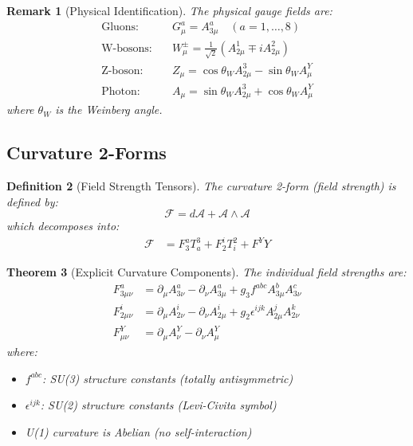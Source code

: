 \documentclass[12pt]{article}
\newtheorem{definition}{Definition}[section]
\newtheorem{theorem}[definition]{Theorem}
\newtheorem{remark}[definition]{Remark}
\begin{document}
\begin{remark}[Physical Identification]
The physical gauge fields are:
\begin{align}
\text{Gluons:} \quad &G^a_\mu = A^a_{3\mu} \quad (a=1,\ldots,8) \\
\text{W-bosons:} \quad &W^\pm_\mu = \frac{1}{\sqrt{2}}(A^1_{2\mu} \mp i A^2_{2\mu}) \\
\text{Z-boson:} \quad &Z_\mu = \cos\theta_W A^3_{2\mu} - \sin\theta_W A^Y_\mu \\
\text{Photon:} \quad &A_\mu = \sin\theta_W A^3_{2\mu} + \cos\theta_W A^Y_\mu
\end{align}
where $\theta_W$ is the Weinberg angle.
\end{remark}

\subsection{Curvature 2-Forms}

\begin{definition}[Field Strength Tensors]
The curvature 2-form (field strength) is defined by:
\begin{equation}
\mathcal{F} = d\mathcal{A} + \mathcal{A} \wedge \mathcal{A}
\end{equation}
which decomposes into:
\begin{align}
\mathcal{F} &= F^a_3 T_a^3 + F^i_2 T_i^2 + F^Y Y
\end{align}
\end{definition}

\begin{theorem}[Explicit Curvature Components]
The individual field strengths are:
\begin{align}
F^a_{3\mu\nu} &= \partial_\mu A^a_{3\nu} - \partial_\nu A^a_{3\mu} + g_3 f^{abc} A^b_{3\mu} A^c_{3\nu} \label{eq:SU3_curvature}\\
F^i_{2\mu\nu} &= \partial_\mu A^i_{2\nu} - \partial_\nu A^i_{2\mu} + g_2 \epsilon^{ijk} A^j_{2\mu} A^k_{2\nu} \label{eq:SU2_curvature}\\
F^Y_{\mu\nu} &= \partial_\mu A^Y_\nu - \partial_\nu A^Y_\mu \label{eq:U1_curvature}
\end{align}
where:
\begin{itemize}
\item $f^{abc}$: SU(3) structure constants (totally antisymmetric)
\item $\epsilon^{ijk}$: SU(2) structure constants (Levi-Civita symbol)
\item U(1) curvature is Abelian (no self-interaction)
\end{itemize}
\end{theorem}
\end{document}
